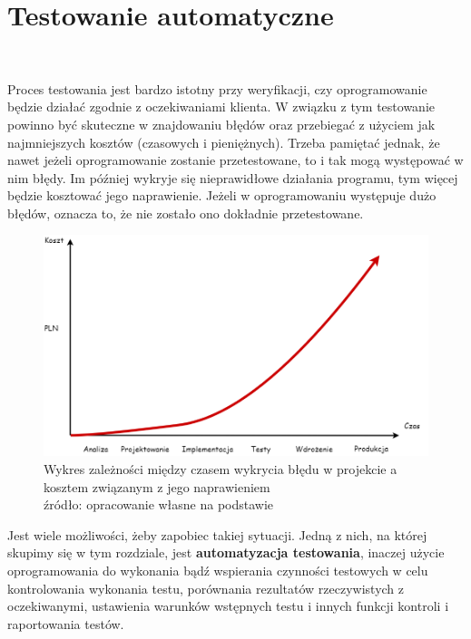 
\section{Testowanie automatyczne} \ \ \

Proces testowania jest bardzo istotny przy weryfikacji, czy oprogramowanie będzie działać zgodnie z oczekiwaniami klienta. W związku z tym testowanie powinno być skuteczne w znajdowaniu błędów oraz przebiegać z użyciem jak najmniejszych kosztów (czasowych i pieniężnych). Trzeba pamiętać jednak, że nawet jeżeli oprogramowanie zostanie przetestowane, to i tak mogą występować w nim błędy. Im później wykryje się nieprawidłowe działania programu, tym więcej będzie kosztować jego naprawienie. Jeżeli w oprogramowaniu występuje dużo błędów, oznacza to, że nie zostało ono dokładnie przetestowane. 

\begin{figure}[H]
\centering
\captionsetup{justification=centering}
\includegraphics[width=1\textwidth]{Diagram.png}
\caption[Wykres zależności między czasem wykrycia błędu w projekcie a kosztem związanym z jego naprawieniem]{\label{fig:ham}Wykres zależności między czasem wykrycia błędu w projekcie a kosztem związanym z jego naprawieniem \\ źródło: opracowanie własne na podstawie \cite{smiglin}}
\end{figure}

 Jest wiele możliwości, żeby zapobiec takiej sytuacji. Jedną z nich, na której skupimy się w tym rozdziale, jest \textbf{automatyzacja testowania}, inaczej użycie oprogramowania do wykonania bądź wspierania czynności testowych w celu kontrolowania wykonania testu, porównania rezultatów rzeczywistych z oczekiwanymi, ustawienia warunków wstępnych testu i innych funkcji kontroli i raportowania testów. \cite{roman}


